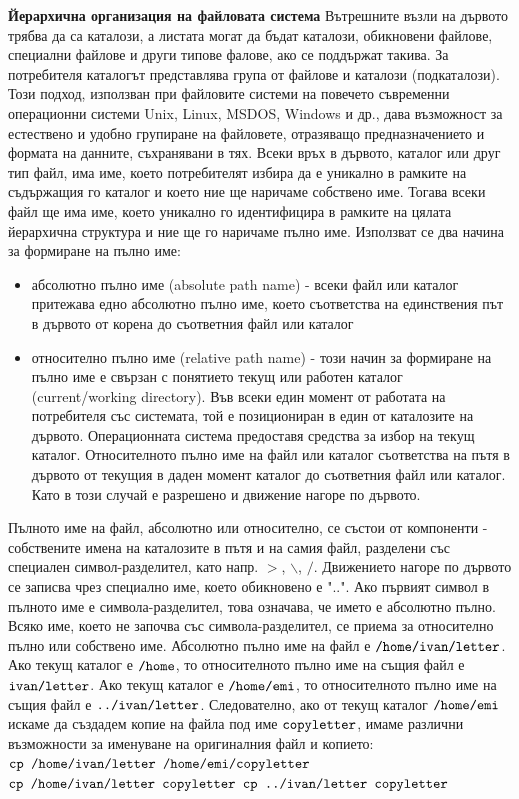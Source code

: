 \documentclass{article}
\newcommand{\cplain}[1]{\textcolor{black}{\texttt{#1}}}
\begin{document}
\textbf{Йерархична организация на файловата система} \newline\newline
Вътрешните възли на дървото трябва да са каталози, а листата могат да бъдат каталози, обикновени файлове, специални файлове и
други типове фалове, ако се поддържат такива. За потребителя каталогът представлява група от файлове и каталози (подкаталози).
Този подход, използван при файловите системи на повечето съвременни операционни системи Unix, Linux, MSDOS, Windows и др.,
дава възможност за естествено и удобно групиране на файловете, отразяващо предназначението и формата на данните, съхранявани в тях.
Всеки връх в дървото, каталог или друг тип файл, има име, което потребителят избира да е уникално в рамките на съдържащия го
каталог и което ние ще наричаме собствено име. Тогава всеки файл ще има име, което уникално го идентифицира в рамките на цялата
йерархична структура и ние ще го наричаме пълно име. Използват се два начина за формиране на пълно име:
\begin{itemize}
    \item абсолютно пълно име (absolute path name) - всеки файл или каталог притежава едно абсолютно пълно име, което съответства
    на единствения път в дървото от корена до съответния файл или каталог
    \item относително пълно име (relative path name) - този начин за формиране на пълно име е свързан с понятието текущ или
    работен каталог (current/working directory). Във всеки един момент от работата на потребителя със системата, той е
    позициониран в един от каталозите на дървото. Операционната система предоставя средства за избор на текущ каталог.
    Относителното пълно име на файл или каталог съответства на пътя в дървото от текущия в даден момент каталог до съответния
    файл или каталог. Като в този случай е разрешено и движение нагоре по дървото.
\end{itemize}
Пълното име на файл, абсолютно или относително, се състои от компоненти - собствените имена на каталозите в пътя и на самия файл,
разделени със специален символ-разделител, като напр. $>$, $\backslash$, $/$. Движението нагоре по дървото се записва чрез специално име,
което обикновено е "..". Ако първият символ в пълното име е символа-разделител, това означава, че името е абсолютно пълно. Всяко
име, което не започва със символа-разделител, се приема за относително пълно или собствено име. Абсолютно пълно име на файл е
$\cplain{/home/ivan/letter}$. Ако текущ каталог е $\cplain{/home}$, то относителното пълно име на същия файл е $\cplain{ivan/letter}$. Ако текущ каталог е
$\cplain{/home/emi}$, то относителното пълно име на същия файл е $\cplain{../ivan/letter}$. Следователно, ако от текущ каталог $\cplain{/home/emi}$
искаме да създадем копие на файла под име $\cplain{copyletter}$, имаме различни възможности за именуване на оригиналния файл и копието: \newline
$\cplain{cp /home/ivan/letter /home/emi/copyletter}$ \newline
$\cplain{cp /home/ivan/letter copyletter}$ \newline
$\cplain{cp ../ivan/letter copyletter}$
\end{document}
